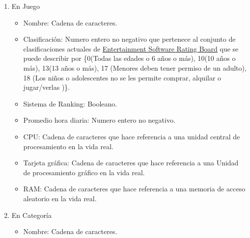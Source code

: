 \documentclass[a4paper,12pt]{article}
\begin{document}
\begin{itemize}
\begin{enumerate}
\item En Juego
\begin{itemize}
\item Nombre: Cadena de caracteres.
\item Clasificación: Numero entero no negativo que pertenece al conjunto de clasificaciones actuales de \href{https://es.wikipedia.org/wiki/Entertainment_Software_Rating_Board "Entertainment Software Rating Board"}{Entertainment Software Rating Board} que se puede describir por \{0(Todas las edades o 6 años o más), 10(10 años o más), 13(13 años o más), 17 (Menores deben tener permiso de un adulto), 18 (Los niños o adolescentes no se les permite comprar, alquilar o jugar/verlas )\}.
\item Sistema de Ranking: Booleano.
\item Promedio hora diaria: Numero entero no negativo.
\item CPU: Cadena de caracteres que hace referencia a una unidad central de procesamiento en la vida real.
\item Tarjeta gráfica: Cadena de caracteres que hace referencia a una Unidad de procesamiento gráfico en la vida real.
\item RAM: Cadena de caracteres que hace referencia a una memoria de acceso aleatorio en la vida real.
\end{itemize}
		
\item En Categoría
\begin{itemize}
\item Nombre: Cadena de caracteres.
\end{itemize}

\end{enumerate}

\end{itemize}
\end{document}
